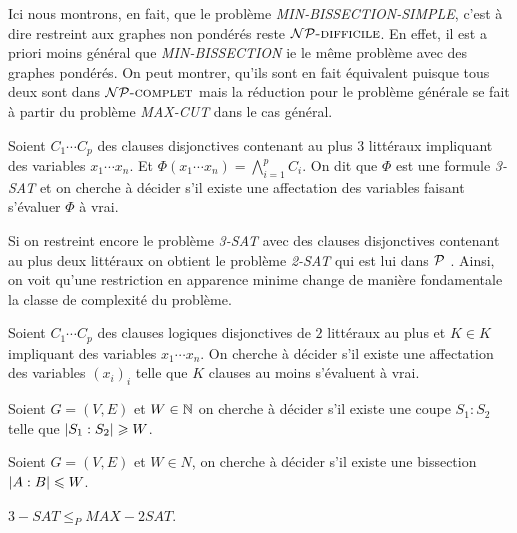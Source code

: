 \documentclass{standalone}
\begin{document}
\begin{rem}
	Ici nous montrons, en fait, que le problème \textit{MIN-BISSECTION-SIMPLE}, c'est à dire restreint aux graphes non pondérés reste $\mathcal{NP}\text{\textsc{-difficile}}$. En effet, il est a priori moins général que \textit{MIN-BISSECTION} ie le même problème avec des graphes pondérés. On peut montrer, qu'ils sont en fait équivalent puisque tous deux sont dans $\mathcal{NP}\text{\textsc{-complet}}$ mais la réduction pour le problème générale se fait à partir du problème \textit{MAX-CUT} dans le cas général.
\end{rem}

\begin{defn}
	Soient $C_1 \cdots C_p$ des clauses disjonctives contenant au plus 3 littéraux impliquant des variables $x_1 \cdots x_n$.
	Et $\Phi(x_1 \cdots x_n) =\bigwedge_{i = 1}^p C_i$.
	On dit que $\Phi$ est une formule \textit{3-SAT} et on cherche à décider s'il existe une affectation des variables faisant s'évaluer $\Phi$ à vrai.
\end{defn}

\begin{rem}
	Si on restreint encore le problème \textit{3-SAT} avec des clauses disjonctives contenant au plus deux littéraux on obtient le problème \textit{2-SAT} qui est lui dans $\mathcal{P}$ \cite{sat}. Ainsi, on voit qu'une restriction en apparence minime change de manière fondamentale la classe de complexité du problème.
\end{rem}

\begin{defn}
	Soient $C_1 \cdots C_p$ des clauses logiques disjonctives de $2$ littéraux au plus et $K\in K$ impliquant des variables $x_1 \cdots x_n$. On cherche à décider s'il existe une affectation des variables $(x_i)_i$ telle que $K$ clauses au moins s'évaluent à vrai.
\end{defn}

\begin{defn}
	Soient $G=(V,E)$ et $W \in \mathbb{N}$ on cherche à décider s'il existe une coupe $S_1:S_2$ telle que $\left| S_1:S_2\right| \geqslant W$.	
\end{defn}

\begin{defn}
	Soient $G=(V, E)$ et $W \in N$, on cherche à décider s'il existe une bissection $\left| A:B\right| \leqslant W$.
\end{defn}

\begin{thm}
	 $3-SAT \leq_P MAX-2SAT$.
\end{thm}
\end{document}

